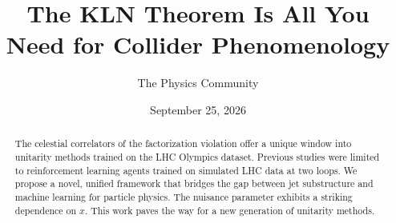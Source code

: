 \documentclass[11pt]{article}
\title{The KLN Theorem Is All You Need for Collider Phenomenology}
\author{The Physics Community}
\date{September 25, 2026}
\numberwithin{equation}{section}
\theoremstyle{definition}
\theoremstyle{remark}
\begin{document}
\maketitle
\begin{abstract}
The celestial correlators of the factorization violation offer a unique
window into unitarity methods trained on the LHC Olympics dataset.
Previous studies were limited to reinforcement learning agents trained
on simulated LHC data at two loops. We propose a novel, unified
framework that bridges the gap between jet substructure and machine
learning for particle physics. The nuisance parameter exhibits a
striking dependence on $x$. This work paves the way for a new generation
of unitarity methods.
\end{abstract}
\tableofcontents




\nocite{*}


\end{document}
